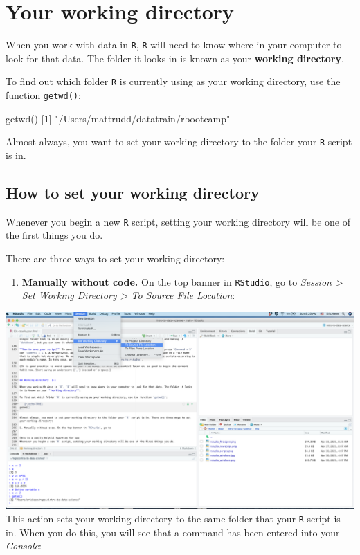 \documentclass[
]{book}
\newenvironment{Shaded}{\begin{snugshade}}{\end{snugshade}}
\newcommand{\DecValTok}[1]{\textcolor[rgb]{0.00,0.00,0.81}{#1}}
\newcommand{\FunctionTok}[1]{\textcolor[rgb]{0.00,0.00,0.00}{#1}}
\newcommand{\NormalTok}[1]{#1}
\newcommand{\StringTok}[1]{\textcolor[rgb]{0.31,0.60,0.02}{#1}}
\providecommand{\tightlist}{%
  \setlength{\itemsep}{0pt}\setlength{\parskip}{0pt}}
\begin{document}
\hypertarget{wd}{%
\section*{Your working directory}\label{wd}}

When you work with data in \texttt{R}, \texttt{R} will need to know where in your computer to look for that data. The folder it looks in is known as your \textbf{working directory}.

To find out which folder \texttt{R} is currently using as your working directory, use the function \texttt{getwd()}:

\begin{Shaded}
\begin{Highlighting}[]
\FunctionTok{getwd}\NormalTok{()}
\NormalTok{[}\DecValTok{1}\NormalTok{] }\StringTok{"/Users/mattrudd/datatrain/rbootcamp"}
\end{Highlighting}
\end{Shaded}

Almost always, you want to set your working directory to the folder your \texttt{R} script is in.

\hypertarget{how-to-set-your-working-directory}{%
\subsection*{How to set your working directory}\label{how-to-set-your-working-directory}}

Whenever you begin a new \texttt{R} script, setting your working directory will be one of the first things you do.

There are three ways to set your working directory:

\begin{enumerate}
\def\labelenumi{\arabic{enumi}.}
\tightlist
\item
  \textbf{Manually without code.} On the top banner in \texttt{RStudio}, go to \emph{Session \textgreater{} Set Working Directory \textgreater{} To Source File Location}:
\end{enumerate}

\includegraphics{img/rstudio_setwd.png}
This action sets your working directory to the same folder that your \texttt{R} script is in. When you do this, you will see that a command has been entered into your \emph{Console}:
\end{document}
